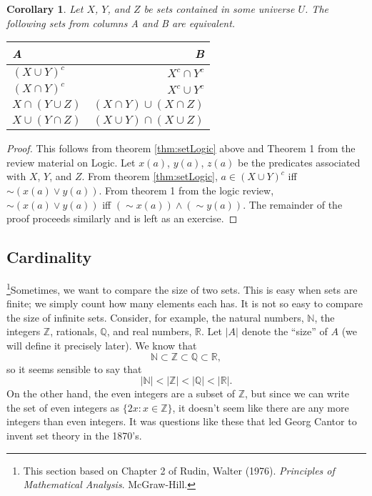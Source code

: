 \documentclass[12pt,reqno]{amsart}
\newtheorem{corollary}{Corollary}[section]
\theoremstyle{definition}
\begin{document}
\begin{corollary}
  Let $X$, $Y$, and $Z$ be sets contained in some universe $U$. 
  The following sets from columns A and B are equivalent.
  \begin{centering}
    \begin{tabular}{l r}
      A       & B \\ \hline
      $(X \cup Y)^c$ & $X^c \cap Y^c$ \\
      $(X \cap Y)^c$ & $X^c \cup Y^c$ \\
      $X \cap (Y \cup Z)$ & $(X \cap Y) \cup (X \cap Z)$ \\
      $X \cup (Y \cap Z)$ & $(X \cup Y) \cap (X \cup Z)$
    \end{tabular}
  \end{centering}
\end{corollary}
\begin{proof}
  This follows from theorem \ref{thm:setLogic} above and Theorem 1
  from the review material on Logic. Let $x(a)$, $y(a)$, $z(a)$ be the
  predicates associated with $X$, $Y$, and $Z$. From theorem
  \ref{thm:setLogic}, $a \in (X \cup Y)^c$ iff $\sim(x(a) \vee
  y(a))$. From theorem 1 from the logic review, $\sim(x(a) \vee y(a))$
  iff $(\sim x(a) ) \wedge (\sim y(a))$. The remainder of the proof
  proceeds similarly and is left as an exercise.
\end{proof}

\subsection{Cardinality \label{s:card}}

\footnote{This section based on Chapter 2 of Rudin, Walter
  (1976). \textit{Principles of Mathematical
    Analysis}. McGraw-Hill.}Sometimes, we want to compare the size of
two sets. This is easy when sets are finite; we simply count how many
elements each has. It is not so easy to compare the size of infinite
sets. Consider, for example, the natural numbers, $\mathbb{N}$, the
integers $\mathbb{Z}$, rationals, $\mathbb{Q}$, and real numbers,
$\mathbb{R}$. Let $|A|$ denote the ``size'' of $A$ (we will define it
precisely later). We know that
\[ \mathbb{N} \subset \mathbb{Z} \subset \mathbb{Q} \subset
\mathbb{R}, \]
so it seems sensible to say that 
\[ |\mathbb{N}| < |\mathbb{Z}| < |\mathbb{Q}| < |\mathbb{R}|. \] 
On the other hand, the even integers are a subset of $\mathbb{Z}$, but
since we can write the set of even integers as $\{2x: x \in \mathbb{Z}
\}$, it doesn't seem like there are any more integers than even
integers. It was questions like these that led Georg Cantor to invent
set theory in the 1870's. 
\end{document}
